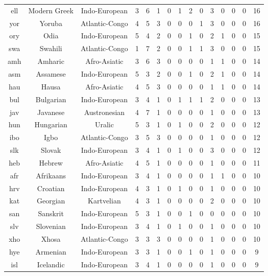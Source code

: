 \begin{longtable}{ccc|ccccccccccc|c}
    ell & Modern Greek & Indo-European & 3 & 6 & 1 & 0 & 1 & 2 & 0 & 3 & 0 & 0 & 0 & 16 \\ 
    yor & Yoruba & Atlantic-Congo & 4 & 5 & 3 & 0 & 0 & 0 & 1 & 3 & 0 & 0 & 0 & 16 \\ 
    ory & Odia & Indo-European & 5 & 4 & 2 & 0 & 0 & 1 & 0 & 2 & 1 & 0 & 0 & 15 \\ 
    swa & Swahili & Atlantic-Congo & 1 & 7 & 2 & 0 & 0 & 1 & 1 & 3 & 0 & 0 & 0 & 15 \\ 
    amh & Amharic & Afro-Asiatic & 3 & 6 & 3 & 0 & 0 & 0 & 0 & 1 & 1 & 0 & 0 & 14 \\ 
    asm & Assamese & Indo-European & 5 & 3 & 2 & 0 & 0 & 1 & 0 & 2 & 1 & 0 & 0 & 14 \\ 
    hau & Hausa & Afro-Asiatic & 4 & 5 & 3 & 0 & 0 & 0 & 0 & 1 & 1 & 0 & 0 & 14 \\ 
    bul & Bulgarian & Indo-European & 3 & 4 & 1 & 0 & 1 & 1 & 1 & 2 & 0 & 0 & 0 & 13 \\ 
    jav & Javanese & Austronesian & 4 & 7 & 1 & 0 & 0 & 0 & 0 & 1 & 0 & 0 & 0 & 13 \\ 
    hun & Hungarian & Uralic & 5 & 3 & 1 & 0 & 1 & 0 & 0 & 2 & 0 & 0 & 0 & 12 \\ 
    ibo & Igbo & Atlantic-Congo & 3 & 5 & 3 & 0 & 0 & 0 & 0 & 1 & 0 & 0 & 0 & 12 \\ 
    slk & Slovak & Indo-European & 3 & 4 & 1 & 0 & 1 & 0 & 0 & 3 & 0 & 0 & 0 & 12 \\ 
    heb & Hebrew & Afro-Asiatic & 4 & 5 & 1 & 0 & 0 & 0 & 0 & 1 & 0 & 0 & 0 & 11 \\ 
    afr & Afrikaans & Indo-European & 3 & 4 & 1 & 0 & 0 & 0 & 0 & 1 & 1 & 0 & 0 & 10 \\ 
    hrv & Croatian & Indo-European & 4 & 3 & 1 & 0 & 1 & 0 & 0 & 1 & 0 & 0 & 0 & 10 \\ 
    kat & Georgian & Kartvelian & 4 & 3 & 1 & 0 & 0 & 0 & 0 & 2 & 0 & 0 & 0 & 10 \\ 
    san & Sanskrit & Indo-European & 5 & 3 & 1 & 0 & 0 & 1 & 0 & 0 & 0 & 0 & 0 & 10 \\ 
    slv & Slovenian & Indo-European & 3 & 4 & 1 & 0 & 1 & 0 & 0 & 1 & 0 & 0 & 0 & 10 \\ 
    xho & Xhosa & Atlantic-Congo & 3 & 3 & 3 & 0 & 0 & 0 & 0 & 1 & 0 & 0 & 0 & 10 \\ 
    hye & Armenian & Indo-European & 3 & 3 & 1 & 0 & 0 & 1 & 0 & 1 & 0 & 0 & 0 & 9 \\ 
    isl & Icelandic & Indo-European & 3 & 4 & 1 & 0 & 0 & 0 & 0 & 1 & 0 & 0 & 0 & 9 \\ 

\end{longtable}
